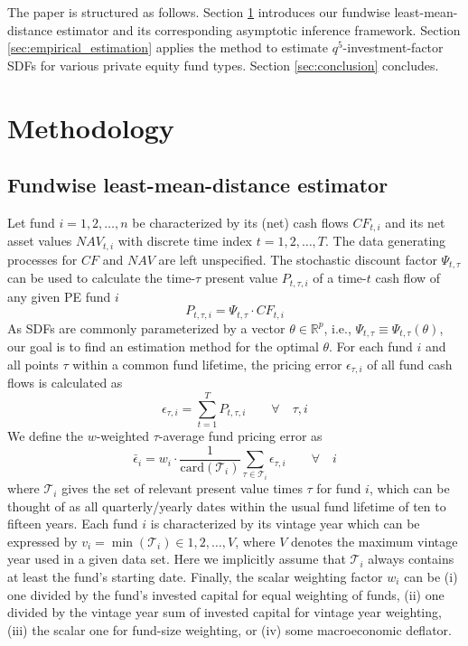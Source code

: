 \documentclass[12pt]{article}
\begin{document}
The paper is structured as follows. 
Section \ref{sec:Methodology} introduces our fundwise least-mean-distance estimator and its corresponding asymptotic inference framework.
Section \ref{sec:empirical_estimation} applies the method to estimate $q^5$-investment-factor SDFs for various private equity fund types.
Section \ref{sec:conclusion} concludes.


\section{Methodology}
\label{sec:Methodology}

\subsection{Fundwise least-mean-distance estimator}
\label{sec:fundwise_lmd_estimator}

Let fund $i=1,2,\dots,n$ be characterized by its (net) cash flows ${CF}_{t,i}$ and its net asset values ${NAV}_{t,i}$ with discrete time index $t=1,2,\dots,T$.
The data generating processes for $CF$ and $NAV$ are left unspecified.
The stochastic discount factor $\Psi_{t,\tau}$ can be used to calculate the time-$\tau$ present value $P_{t,\tau,i}$ of a time-$t$ cash flow of any given PE fund $i$
\begin{equation}
\label{eq:price}
P_{t,\tau,i} = \Psi_{t,\tau} \cdot CF_{t,i}
\end{equation}
As SDFs are commonly parameterized by a vector $\theta \in \mathbb{R}^p$, i.e., $\Psi_{t,\tau} \equiv \Psi_{t,\tau} (\theta)$, our goal is to find an estimation method for the optimal $\theta$.
For each fund $i$ and all points $\tau$ within a common fund lifetime, the pricing error $\epsilon_{\tau,i}$ of all fund cash flows is calculated as
\begin{equation}
\label{eq:pricing_error}
\epsilon_{\tau,i} = \sum_{t=1}^T P_{t,\tau,i} 
\qquad \forall \quad \tau,i
\end{equation}
We define the $w$-weighted $\tau$-average fund pricing error as
\begin{equation}
\label{eq:average_pricing_error}
\bar{\epsilon}_{i} =
w_{i} \cdot
\frac{1}{\mathrm{card}( \mathcal{T}_{i}) }
\sum_{\tau \in \mathcal{T}_{i}}
\epsilon_{\tau,i}
\qquad \forall \quad i
\end{equation}
where $\mathcal{T}_i$ gives the set of relevant present value times $\tau$ for fund $i$, which can be thought of as all quarterly/yearly dates within the usual fund lifetime of ten to fifteen years.
Each fund $i$ is characterized by its vintage year which can be expressed by $v_{i}=\min(\mathcal{T}_i) \in 1,2,\dots,V$, where $V$ denotes the maximum vintage year used in a given data set.
Here we implicitly assume that $\mathcal{T}_i$ always contains at least the fund's starting date.
Finally, the scalar weighting factor $w_i$ can be (i) one divided by the fund's invested capital for equal weighting of funds, (ii) one divided by the vintage year sum of invested capital for vintage year weighting, (iii) the scalar one for fund-size weighting, or (iv) some macroeconomic deflator.
\end{document}
